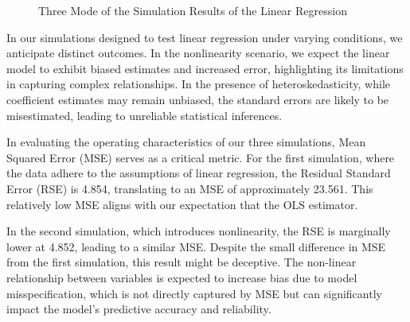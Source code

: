 \documentclass[12pt]{article}
\numberwithin{figure}{section}
\begin{document}
\begin{figure}[H]
    \centering
    \caption{Three Mode of the Simulation Results of the Linear Regression}
    \label{fig:lm}
\end{figure}

In our simulations designed to test linear regression under varying conditions, we anticipate distinct outcomes. In the nonlinearity scenario, we expect the linear model to exhibit biased estimates and increased error, highlighting its limitations in capturing complex relationships. In the presence of heteroskedasticity, while coefficient estimates may remain unbiased, the standard errors are likely to be misestimated, leading to unreliable statistical inferences. 

In evaluating the operating characteristics of our three simulations, Mean Squared Error (MSE) serves as a critical metric. For the first simulation, where the data adhere to the assumptions of linear regression, the Residual Standard Error (RSE) is 4.854, translating to an MSE of approximately 23.561. This relatively low MSE aligns with our expectation that the OLS estimator. 

In the second simulation, which introduces nonlinearity, the RSE is marginally lower at 4.852, leading to a similar MSE. Despite the small difference in MSE from the first simulation, this result might be deceptive. The non-linear relationship between variables is expected to increase bias due to model misspecification, which is not directly captured by MSE but can significantly impact the model's predictive accuracy and reliability.
\end{document}
